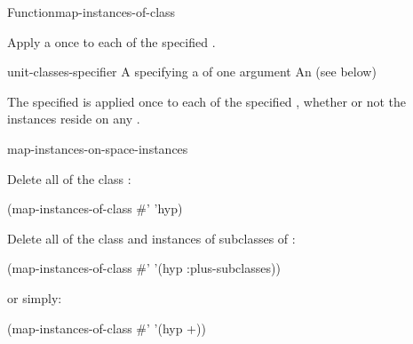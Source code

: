 \documentclass[10pt,twoside,english,pdftex]{article}
\begin{document}
\begin{functiondoc}{Function}{map-instances-of-class}%
  {}
%
%

\fnsyntax

\fnpurpose Apply a  once to each  of the
specified . 

\fnpackage {}

\fnmodule {}

\fnargs
\begin{args}{unit-classes-specifier}
\arg[function] A  specifying a
  of one argument
 An 
(see below)
\end{args}

\fndsyntax
\W\supp\tabletop
\unitclassesspec
\subclassingspec

\fndescription The specified  is applied once to each
 of the specified , whether
or not the instances reside on any .

\begin{alsos}{map-instances-on-space-instances}
\end{alsos}

\fnexamples
Delete all  of the class :
%
\W\supp
\begin{example}
  (map-instances-of-class #' 'hyp)
\end{example} 
%
Delete all  of the class  and
instances of subclasses of :
%
\W\supp\notpretop
\begin{example}
  (map-instances-of-class #' '(hyp :plus-subclasses))
\end{example} 
%
or simply:
%
\W\supp\notpretop
\begin{example}
  (map-instances-of-class #' '(hyp +))
\end{example} 


\end{functiondoc}
\end{document}
